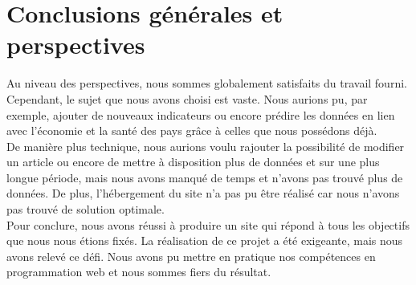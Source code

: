 \documentclass[12pt,a4paper]{report}
\begin{document}
\section{Conclusions générales et perspectives}
Au niveau des perspectives, nous sommes globalement satisfaits du travail fourni. Cependant, le sujet que nous avons choisi est vaste. Nous aurions pu, par exemple, ajouter de nouveaux indicateurs ou encore prédire les données en lien avec l'économie et la santé des pays grâce à celles que nous possédons déjà. \\

De manière plus technique, nous aurions voulu rajouter la possibilité de modifier un article ou encore de mettre à disposition plus de données et sur une plus longue période, mais nous avons manqué de temps et n'avons pas trouvé plus de données. De plus, l'hébergement du site n'a pas pu être réalisé car nous n'avons pas trouvé de solution optimale. \\

Pour conclure, nous avons réussi à produire un site qui répond à tous les objectifs que nous nous étions fixés. La réalisation de ce projet a été exigeante, mais nous avons relevé ce défi. Nous avons pu mettre en pratique nos compétences en programmation web et nous sommes fiers du résultat.
\end{document}
